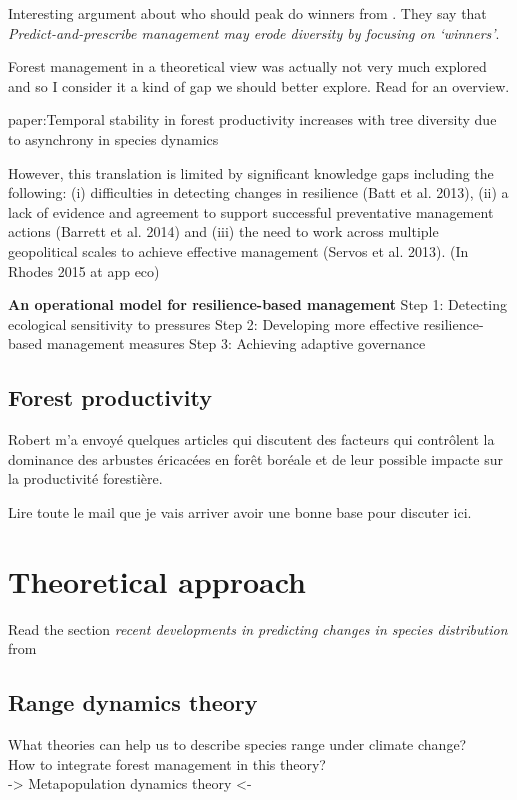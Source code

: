 Interesting argument about who should peak do winners from \citet{Webster2017}. They say that \textit{Predict-and-prescribe management may erode diversity by focusing on ‘winners’}.

Forest management in a theoretical view was actually not very much explored and so I consider it a kind of gap we should better explore. Read \citet{Becknell2015} for an overview.

paper:Temporal stability in forest productivity increases with tree diversity due to asynchrony in species dynamics

However, this translation is limited by significant knowledge gaps including the following: (i) difficulties in detecting changes in resilience (Batt et al. 2013), (ii) a lack of evidence and agreement to support successful preventative management actions (Barrett et al. 2014) and (iii) the need to work across multiple geopolitical scales to achieve effective management (Servos et al. 2013). (In Rhodes 2015 at app eco)

\textbf{An operational model for resilience-based management}
Step 1: Detecting ecological sensitivity to pressures
Step 2: Developing more effective resilience-based management measures
Step 3: Achieving adaptive governance

\subsection{Forest productivity}
Robert m'a envoyé quelques articles qui discutent des facteurs qui contrôlent la dominance des arbustes éricacées en forêt boréale et de leur possible impacte sur la productivité forestière.

Lire toute le mail que je vais arriver avoir une bonne base pour discuter ici.

\section{Theoretical approach}\label{ta}

Read the section \textit{recent developments in predicting changes in species distribution} from \citet{Ehrlen2015}

\subsection{Range dynamics theory}

What theories can help us to describe species range under climate change?\\
How to integrate forest management in this theory?\\
-> Metapopulation dynamics theory <-

